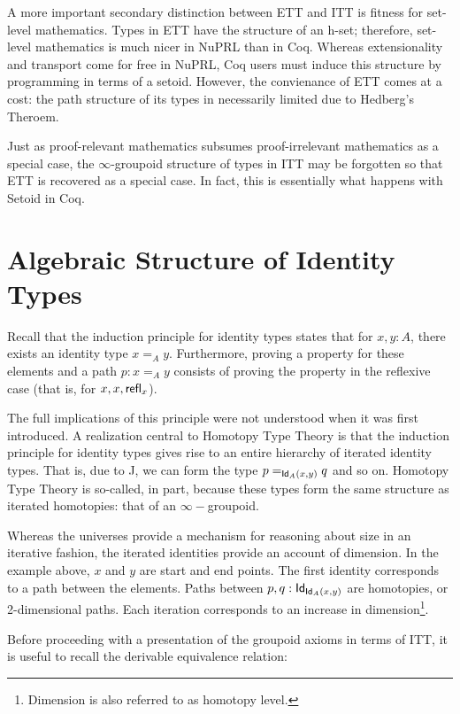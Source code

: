 \documentclass[12pt]{article}
\begin{document}
A more important secondary distinction between ETT and ITT is fitness for set-
level mathematics.  Types in ETT have the structure of an h-set; 
therefore, set-level mathematics is much nicer in NuPRL than in Coq. Whereas extensionality
and transport come for free in NuPRL, Coq users must induce this structure by
programming in terms of a setoid.  However, the convienance of ETT comes at a cost: 
the path structure of its types in necessarily limited due to Hedberg's Theroem.

Just as proof-relevant mathematics subsumes proof-irrelevant mathematics as a 
special case, the $\infty$-groupoid structure of types in ITT may be
forgotten so that ETT is recovered as a special case.  In fact, this is 
essentially what happens with Setoid in Coq.

\section{Algebraic Structure of Identity Types}\label{sec:structure}

Recall that the induction principle for identity types states that for
$x,y :A $, there exists an identity type $x =_A y$.  Furthermore, proving a
property for these elements and a path $p : x = _A y$ consists of proving the
property in the reflexive case (that is, for $x, x, \mathsf{refl}_{x}$).

The full implications of this principle were not understood when it was 
first introduced.  A realization central to Homotopy Type Theory
is that the induction principle for identity types
gives rise to an entire hierarchy of iterated identity types.
That is, due to J, we can form the type $p =_{\mathsf{Id}_{A}(x,y)} q$ and so on.
Homotopy Type Theory is so-called, in part, because these types form the
same structure as iterated homotopies: that of an $\infty-$groupoid.

Whereas the universes provide a mechanism for reasoning about size in an
iterative fashion, the iterated identities provide an account of dimension.
In the example above, $x$ and $y$ are start and end points.  The first identity 
corresponds to a path between the elements.  Paths between $p,q : \mathsf{Id}_{\mathsf{Id}_{A}(x,y)}$
are homotopies, or 2-dimensional paths.  Each iteration corresponds to an increase
in dimension\footnote{Dimension is also referred to as homotopy level.}.

Before proceeding with a presentation of the groupoid axioms in terms of 
ITT, it is useful to recall the derivable equivalence relation:
\end{document}
